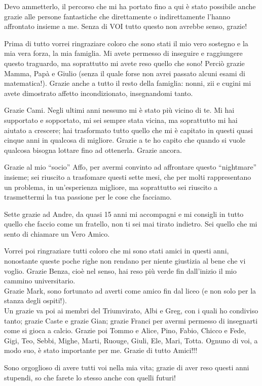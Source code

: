 
Devo ammetterlo, il percorso che mi ha portato fino a qui è stato possibile anche grazie alle persone fantastiche che direttamente o indirettamente l'hanno affrontato insieme a me. Senza di VOI tutto questo non avrebbe senso, grazie!

Prima di tutto vorrei ringraziare coloro che sono stati il mio vero sostegno e la mia vera forza, la mia famiglia. Mi avete permesso di inseguire e raggiungere questo traguardo, ma soprattutto mi avete reso quello che sono! Perciò grazie 
Mamma, Papà e Giulio (senza il quale forse non avrei passato alcuni esami di matematica!). Grazie anche a tutto il resto della famiglia: nonni, zii e cugini mi avete dimostrato affetto incondizionato, insegnandomi tanto.

Grazie Cami. Negli ultimi anni nessuno mi è stato più vicino di te. Mi hai supportato e sopportato, mi sei sempre stata vicina, ma soprattutto mi hai aiutato a crescere; hai trasformato tutto quello che mi è capitato in questi quasi cinque anni in qualcosa di migliore. Grazie a te ho capito che quando si vuole qualcosa bisogna lottare fino ad ottenerla. Grazie ancora.

Grazie al mio ``socio'' Affo, per avermi convinto ad affrontare questo ``nightmare'' insieme; sei riuscito a trasfomare questi sette mesi, che per molti rappresentano un problema, in un'esperienza migliore, ma soprattutto sei riuscito a trasmettermi la tua passione per le cose che facciamo.

Sette grazie ad Andre, da quasi 15 anni mi accompagni e mi consigli in tutto quello che faccio come un fratello, non ti sei mai tirato indietro. Sei quello che mi sento di chiamare un Vero Amico.

Vorrei poi ringraziare tutti coloro che mi sono stati amici in questi anni, nonostante queste poche righe non rendano per niente giustizia al bene che vi voglio. Grazie Benza, cioè nel senso, hai reso più verde fin dall'inizio il mio cammino universitario.\\ Grazie Mark, sono fortunato ad averti come amico fin dal liceo (e non solo per la stanza degli ospiti!).\\ Un grazie va poi ai membri del Triumvirato, Albi e Greg, con i quali ho condiviso tanto; grazie Caste e grazie Gian; grazie Franci per avermi permesso di insegnarti come si gioca a calcio. Grazie poi Tommo e Alice, Pino, Fabio, Chicco e Fede, Gigi, Teo, Sebbi, Mighe, Marti, Ruouge, Giuli, Ele, Mari, Totta. Ognuno di voi, a modo suo, è stato importante per me. Grazie di tutto Amici!!!

Sono orgoglioso di avere tutti voi nella mia vita; grazie di aver reso questi anni stupendi, so che farete lo stesso anche con quelli futuri!